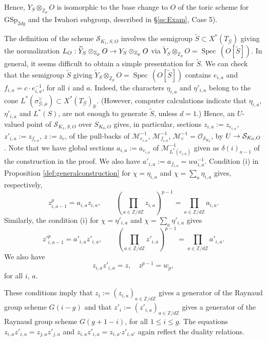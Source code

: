 \documentclass[reqno, 10pt]{amsart}
\makeatletter
\newcommand{\BR}{\ensuremath{\mathbb {R}}\xspace}
\newcommand{\BZ}{\ensuremath{\mathbb {Z}}\xspace}
\newcommand{\CG}{\ensuremath{\mathcal {G}}\xspace}
\newcommand{\CM}{\ensuremath{\mathcal {M}}\xspace}
\newcommand{\CO}{\ensuremath{\mathcal {O}}\xspace}
\newcommand{\CS}{\ensuremath{\mathcal {S}}\xspace}
\newcommand{\GSp}{\mathrm{GSp}}
\DeclareMathOperator{\Spec}{Spec\,}
\newcommand{\wt}{\widetilde}
\theoremstyle{definition}
\numberwithin{equation}{subsection}
\numberwithin{subsubsection}{subsection}
\renewcommand{\to}{%
   \ifbool{@display}{\longrightarrow}{\rightarrow}%
   }
\makeatother
\begin{document}
Hence, $Y_S\otimes_{\BZ_p}O$ is isomorphic to the base change to $O$ of the toric scheme for $\GSp_{2dg}$ and the Iwahori subgroup, described in \S \ref{ss:Exam}, Case 5).  

The definition of the scheme $\CS_{K_1,S, O}$ involves the semigroup $\wt S\subset X^*(T_\CG)$ giving the normalization $L_{O}: \wt Y_S\otimes_{\BZ_p}O\to Y_S\otimes_{\BZ_p}O$ via $\wt Y_S\otimes_{\BZ_p}O=\Spec(O[\wt S])$. In general, it seems difficult to obtain a simple   presentation for $\wt S$. We can check that the semigroup $\wt S$ giving  $\wt Y_S\otimes_{\BZ_p}O=\Spec(O[\wt S])$  contains  $e_{i, a}$ and $f_{i, a}= c\cdot e_{i, a}^{-1}$, for all $i$ and $a$. Indeed, the characters  $ \eta_{i, a} $ and $\eta'_{i, a} $ belong to the cone $L^*( \sigma^\vee_{\CG,\mu})\subset X^*(T_\CG)_\BR$.
(However, computer calculations indicate that $ \eta_{i, a} $, $\eta'_{i, a} $ and $L^*(S)$, are not enough to generate $\wt S$, unless $d=1$.) 
Hence, an $U$-valued point of $\CS_{K_1,S, O}$ over $S_{K_0,O}$ gives, in particular, sections $z_{i,a}:=z_{e_{i, a}}$,
 $z'_{i,a}:=z_{f_{i, a}}$, $z:=z_c$, of the pull-backs of  $\CM^{-1}_{e_{i, a}}$, $\CM^{-1}_{f_{i, a}}$, $\CM^{-1}_c=\CO_{\CS_{K_0}}$, by $U\to \CS_{K_0,O}$. Note that we have 
 global sections $a_{i,a}:=a_{e_{i,a}}$ of $\CM^{-1}_{L^*(e_{i,a})}$ given as $\delta(i)_{a-1}$ of the construction in the proof. 
 We also have $a'_{i,a}:=a_{f_{i,a}}=w a_{i,a}^{-1}$.
 Condition (i) in Proposition \ref{def:generalconstruction} for $\chi=\eta_{i, a}$ and $\chi=\sum_{a}\eta_{i,a}$  gives, respectively,
 \[
 z_{ i, a-1}^p=a_{i,a}z_{ i, a},\qquad 
 (\prod_{a\in \BZ/d\BZ}z_{i,a})^{p-1}=\prod_{a\in \BZ/d\BZ}a_{i,a}.
 \]
 Similarly, the condition (i) for $\chi=\eta'_{i, a}$ and $\chi=\sum_{a}\eta'_{i, a}$ gives
 \[
{ z'}_{ i, a-1}^p=a'_{i,a}z'_{ i, a}, \qquad (\prod_{a\in \BZ/d\BZ}z'_{i,a})^{p-1}=\prod_{a\in \BZ/d\BZ}a'_{i,a}.
 \]
 We also have 
 \[
 z_{i,a}z'_{i,a}=z,\quad z^{p-1}=w_p,
 \]
 for all $i$, $a$.
 
 These conditions imply that 
$
z_i:=(z_{i, a})_{a\in \BZ/d\BZ}
$
gives a   generator of the Raynaud group scheme $G(i-g)$ and that
$
z'_i:=(z'_{i, a})_{a\in \BZ/d\BZ}
$
gives a  generator of the Raynaud group scheme $G(g+1-i)$, for all $1\leq i\leq g$. The equations  $z_{i,a}z'_{i,a}=z_{j,a}z'_{j,a}$
and $z_{i,a}z'_{i,a}=z_{i,a'}z'_{i,a'}$ again reflect the duality relations. 
\end{document}
